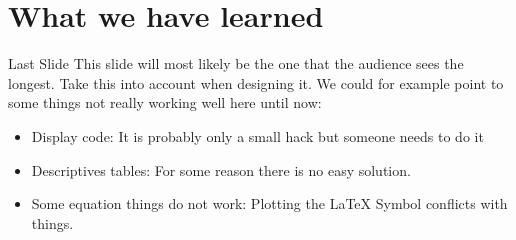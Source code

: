 \documentclass[11pt, aspectratio=169, t]{beamer}
\begin{document}
\hypertarget{what-we-have-learned}{%
\section{What we have learned}\label{what-we-have-learned}}

\begin{frame}{Last Slide}
\protect\hypertarget{last-slide}{}
This slide will most likely be the one that the audience sees the
longest. Take this into account when designing it. We could for example
point to some things not really working well here until now:

\begin{itemize}
\item
  Display code: It is probably only a small hack but someone needs to do
  it
\item
  Descriptives tables: For some reason there is no easy solution.
\item
  Some equation things do not work: Plotting the LaTeX Symbol conflicts
  with things.
\end{itemize}
\end{frame}
\end{document}

